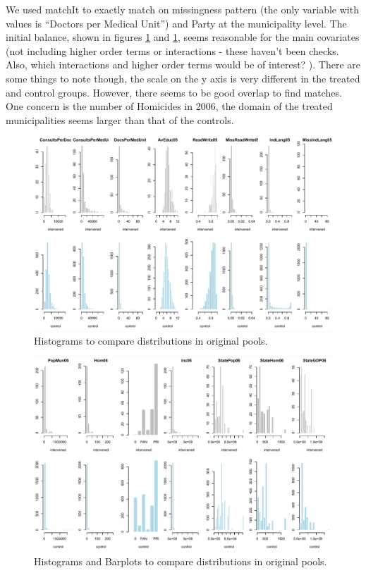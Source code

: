 \documentclass{article}[11 pt]
\begin{document}
We used matchIt to exactly match on missingness pattern (the only variable with values is ``Doctors per Medical Unit'') and Party at the municipality level. The initial balance, shown in figures \ref{initBalance1} and \ref{initBalance1}, seems reasonable for the main covariates (not including higher order terms or interactions - these haven't been checks. Also, which interactions and higher order terms would be of interest? ). There are some things to note though, the scale on the y axis is very different in the treated and control groups. However, there seems to be good overlap to find matches. One concern is the number of Homicides in 2006, the domain of the treated municipalities seems larger than that of the controls.

\begin{figure}[ht]

    \centering
        \includegraphics[scale=0.6]{InitBalance1.pdf}
\caption{Histograms to compare distributions in original pools.}
\label{initBalance1}
\end{figure}

\begin{figure}[ht]

    \centering
        \includegraphics[scale=0.6]{InitBalance2.pdf}
\caption{Histograms and Barplots  to compare distributions in original pools.}
\label{initBalance2}
\end{figure}
\end{document}
